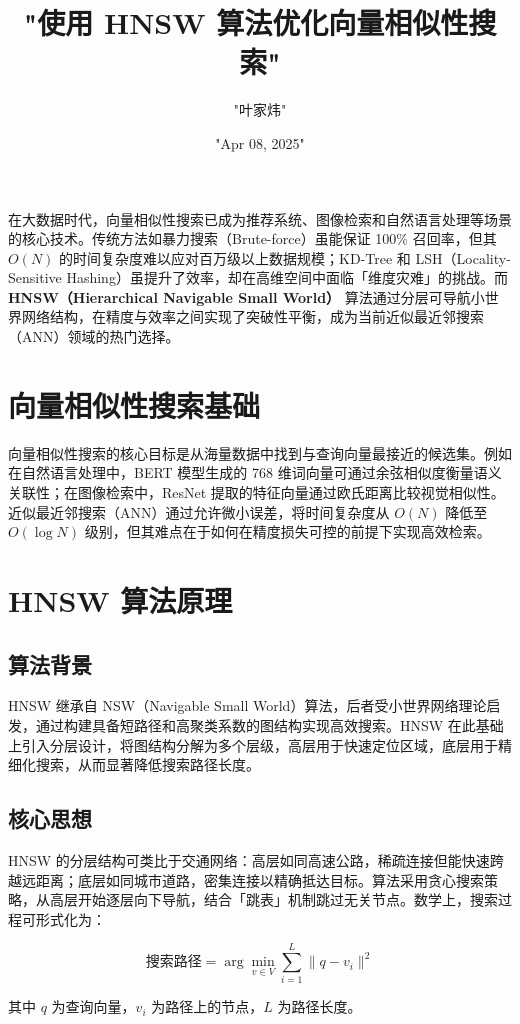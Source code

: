 \title{"使用 HNSW 算法优化向量相似性搜索"}
\author{"叶家炜"}
\date{"Apr 08, 2025"}
\maketitle
在大数据时代，向量相似性搜索已成为推荐系统、图像检索和自然语言处理等场景的核心技术。传统方法如暴力搜索（Brute-force）虽能保证 100\%{} 召回率，但其 $O(N)$ 的时间复杂度难以应对百万级以上数据规模；KD-Tree 和 LSH（Locality-Sensitive Hashing）虽提升了效率，却在高维空间中面临「维度灾难」的挑战。而 \textbf{HNSW（Hierarchical Navigable Small World）} 算法通过分层可导航小世界网络结构，在精度与效率之间实现了突破性平衡，成为当前近似最近邻搜索（ANN）领域的热门选择。\par
\chapter{向量相似性搜索基础}
向量相似性搜索的核心目标是从海量数据中找到与查询向量最接近的候选集。例如在自然语言处理中，BERT 模型生成的 768 维词向量可通过余弦相似度衡量语义关联性；在图像检索中，ResNet 提取的特征向量通过欧氏距离比较视觉相似性。近似最近邻搜索（ANN）通过允许微小误差，将时间复杂度从 $O(N)$ 降低至 $O(\log N)$ 级别，但其难点在于如何在精度损失可控的前提下实现高效检索。\par
\chapter{HNSW 算法原理}
\section{算法背景}
HNSW 继承自 NSW（Navigable Small World）算法，后者受小世界网络理论启发，通过构建具备短路径和高聚类系数的图结构实现高效搜索。HNSW 在此基础上引入分层设计，将图结构分解为多个层级，高层用于快速定位区域，底层用于精细化搜索，从而显著降低搜索路径长度。\par
\section{核心思想}
HNSW 的分层结构可类比于交通网络：高层如同高速公路，稀疏连接但能快速跨越远距离；底层如同城市道路，密集连接以精确抵达目标。算法采用贪心搜索策略，从高层开始逐层向下导航，结合「跳表」机制跳过无关节点。数学上，搜索过程可形式化为：\par
$$ \text{搜索路径} = \arg\min_{v \in V} \sum_{i=1}^{L} \|q - v_i\|^2 $$\par
其中 $q$ 为查询向量，$v_i$ 为路径上的节点，$L$ 为路径长度。\par
